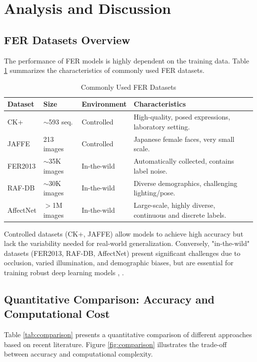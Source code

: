 \documentclass[journal]{IEEEtran}
\begin{document}
\section{Analysis and Discussion}

\subsection{FER Datasets Overview}
The performance of FER models is highly dependent on the training data. Table \ref{tab:datasets} summarizes the characteristics of commonly used FER datasets.

\begin{table}[htbp]
    \centering
    \caption{Commonly Used FER Datasets}
    \label{tab:datasets}
    \scriptsize
    \renewcommand{\arraystretch}{1.2}
    \begin{tabularx}{\columnwidth}{l l l X}
        \toprule
        \textbf{Dataset} & \textbf{Size} & \textbf{Environment} & \textbf{Characteristics} \\
        \midrule
        CK+ \cite{ref:lucey2010} & $\sim$593 seq. & Controlled & High-quality, posed expressions, laboratory setting. \\
        JAFFE \cite{ref:lyons1998} & 213 images & Controlled & Japanese female faces, very small scale. \\
        FER2013 \cite{ref:goodfellow2013} & $\sim$35K images & In-the-wild & Automatically collected, contains label noise. \\
        RAF-DB \cite{ref:li2017} & $\sim$30K images & In-the-wild & Diverse demographics, challenging lighting/pose. \\
        AffectNet \cite{ref:mollahosseini2017} & $>$1M images & In-the-wild & Large-scale, highly diverse, continuous and discrete labels. \\
        \bottomrule
    \end{tabularx}
\end{table}

Controlled datasets (CK+, JAFFE) allow models to achieve high accuracy but lack the variability needed for real-world generalization. Conversely, "in-the-wild" datasets (FER2013, RAF-DB, AffectNet) present significant challenges due to occlusion, varied illumination, and demographic biases, but are essential for training robust deep learning models \cite{ref:gaya2025}, \cite{ref:khan2025}.

\subsection{Quantitative Comparison: Accuracy and Computational Cost}
Table \ref{tab:comparison} presents a quantitative comparison of different approaches based on recent literature. Figure \ref{fig:comparison} illustrates the trade-off between accuracy and computational complexity.
\end{document}
